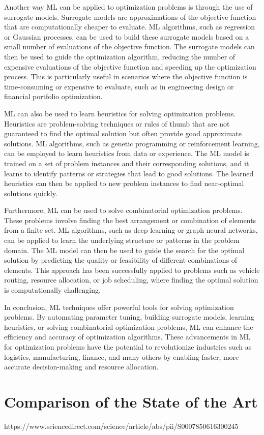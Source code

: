 Another way ML can be applied to optimization problems is through the use of surrogate models. Surrogate models are approximations of the objective function that are computationally cheaper to evaluate. ML algorithms, such as regression or Gaussian processes, can be used to build these surrogate models based on a small number of evaluations of the objective function. The surrogate models can then be used to guide the optimization algorithm, reducing the number of expensive evaluations of the objective function and speeding up the optimization process. This is particularly useful in scenarios where the objective function is time-consuming or expensive to evaluate, such as in engineering design or financial portfolio optimization.

ML can also be used to learn heuristics for solving optimization problems. Heuristics are problem-solving techniques or rules of thumb that are not guaranteed to find the optimal solution but often provide good approximate solutions. ML algorithms, such as genetic programming or reinforcement learning, can be employed to learn heuristics from data or experience. The ML model is trained on a set of problem instances and their corresponding solutions, and it learns to identify patterns or strategies that lead to good solutions. The learned heuristics can then be applied to new problem instances to find near-optimal solutions quickly.

Furthermore, ML can be used to solve combinatorial optimization problems. These problems involve finding the best arrangement or combination of elements from a finite set. ML algorithms, such as deep learning or graph neural networks, can be applied to learn the underlying structure or patterns in the problem domain. The ML model can then be used to guide the search for the optimal solution by predicting the quality or feasibility of different combinations of elements. This approach has been successfully applied to problems such as vehicle routing, resource allocation, or job scheduling, where finding the optimal solution is computationally challenging.

In conclusion, ML techniques offer powerful tools for solving optimization problems. By automating parameter tuning, building surrogate models, learning heuristics, or solving combinatorial optimization problems, ML can enhance the efficiency and accuracy of optimization algorithms. These advancements in ML for optimization problems have the potential to revolutionize industries such as logistics, manufacturing, finance, and many others by enabling faster, more accurate decision-making and resource allocation.
\section{Comparison of the State of the Art}%
https://www.sciencedirect.com/science/article/abs/pii/S0007850616300245